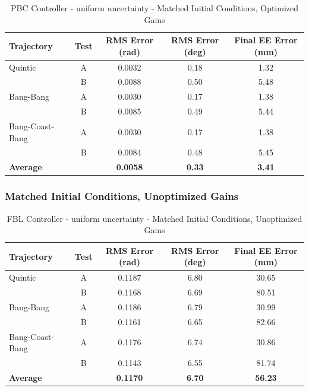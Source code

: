 \documentclass[11pt,a4paper]{article}
\begin{document}
\begin{table}[H]
\centering
\caption{PBC Controller - uniform uncertainty - Matched Initial Conditions, Optimized Gains}
\begin{tabular}{lcccc}
\toprule
Trajectory & Test & RMS Error (rad) & RMS Error (deg) & Final EE Error (mm) \\
\midrule
Quintic & A & 0.0032 & 0.18 & 1.32 \\
 & B & 0.0088 & 0.50 & 5.48 \\
\midrule
Bang-Bang & A & 0.0030 & 0.17 & 1.38 \\
 & B & 0.0085 & 0.49 & 5.44 \\
\midrule
Bang-Coast-Bang & A & 0.0030 & 0.17 & 1.38 \\
 & B & 0.0084 & 0.48 & 5.45 \\
\midrule
\textbf{Average} & & \textbf{0.0058} & \textbf{0.33} & \textbf{3.41} \\
\bottomrule
\end{tabular}
\end{table}

\subsubsection{Matched Initial Conditions, Unoptimized Gains}

\begin{table}[H]
\centering
\caption{FBL Controller - uniform uncertainty - Matched Initial Conditions, Unoptimized Gains}
\begin{tabular}{lcccc}
\toprule
Trajectory & Test & RMS Error (rad) & RMS Error (deg) & Final EE Error (mm) \\
\midrule
Quintic & A & 0.1187 & 6.80 & 30.65 \\
 & B & 0.1168 & 6.69 & 80.51 \\
\midrule
Bang-Bang & A & 0.1186 & 6.79 & 30.99 \\
 & B & 0.1161 & 6.65 & 82.66 \\
\midrule
Bang-Coast-Bang & A & 0.1176 & 6.74 & 30.86 \\
 & B & 0.1143 & 6.55 & 81.74 \\
\midrule
\textbf{Average} & & \textbf{0.1170} & \textbf{6.70} & \textbf{56.23} \\
\bottomrule
\end{tabular}
\end{table}
\end{document}
